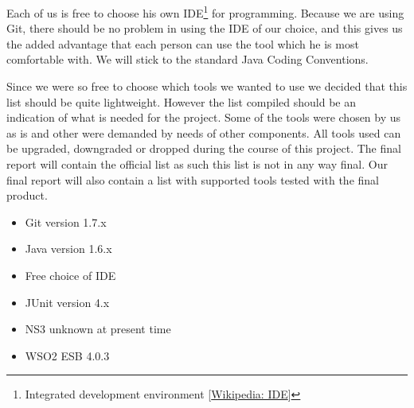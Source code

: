     Each of us is free to choose his own IDE\footnote
        {Integrated development environment [\href{http://en.wikipedia.org/wiki/Integrated_development_environment}{Wikipedia: IDE}]} for programming. Because we are using Git, there should be no problem in using the IDE of our choice, and this gives us the added advantage that each person can use the tool which he is most comfortable with. We will stick to the standard Java Coding Conventions.
    
    Since we were so free to choose which tools we wanted to use we decided that this list should be quite lightweight. However the list compiled should be an indication of what is needed for the project. Some of the tools were chosen by us as is and other were demanded by needs of other components. All tools used can be  upgraded, downgraded or dropped during the course of this project. The final report will contain the official list as such this list is not in any way final. Our final report will also contain a list with supported tools tested with the final product.
    \begin{itemize}
        \item Git version 1.7.x
        \item Java version 1.6.x
        \item Free choice of IDE
        \item JUnit version 4.x
        \item NS3 unknown at present time
        \item WSO2 ESB 4.0.3
    \end{itemize}
    

